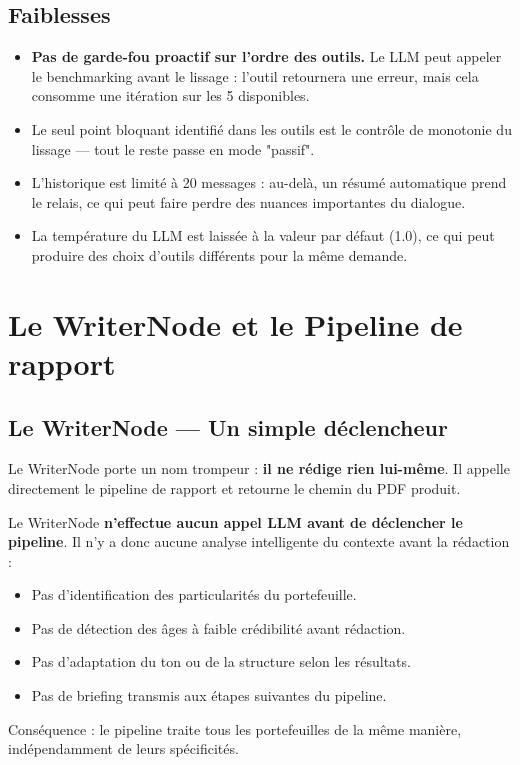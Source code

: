 \documentclass[12pt,a4paper]{article}
\begin{document}
\subsection{Faiblesses}

\begin{weaknessbox}
\begin{itemize}[leftmargin=1.5em]
  \item \textbf{Pas de garde-fou proactif sur l'ordre des outils.} Le LLM peut
        appeler le benchmarking avant le lissage : l'outil retournera une erreur,
        mais cela consomme une itération sur les 5 disponibles.
  \item Le seul point bloquant identifié dans les outils est le contrôle de
        monotonie du lissage — tout le reste passe en mode "passif".
  \item L'historique est limité à 20 messages : au-delà, un résumé automatique
        prend le relais, ce qui peut faire perdre des nuances importantes du dialogue.
  \item La température du LLM est laissée à la valeur par défaut (1.0), ce qui
        peut produire des choix d'outils différents pour la même demande.
\end{itemize}
\end{weaknessbox}

\newpage

\section{Le WriterNode et le Pipeline de rapport}

\subsection{Le WriterNode — Un simple déclencheur}

Le WriterNode porte un nom trompeur : \textbf{il ne rédige rien lui-même}.
Il appelle directement le pipeline de rapport et retourne le chemin du PDF produit.

\begin{blockerbox}
Le WriterNode \textbf{n'effectue aucun appel LLM avant de déclencher le pipeline}.
Il n'y a donc aucune analyse intelligente du contexte avant la rédaction :
\begin{itemize}[leftmargin=1.5em, itemsep=0pt]
  \item Pas d'identification des particularités du portefeuille.
  \item Pas de détection des âges à faible crédibilité avant rédaction.
  \item Pas d'adaptation du ton ou de la structure selon les résultats.
  \item Pas de briefing transmis aux étapes suivantes du pipeline.
\end{itemize}
Conséquence : le pipeline traite tous les portefeuilles de la même manière,
indépendamment de leurs spécificités.
\end{blockerbox}
\end{document}
